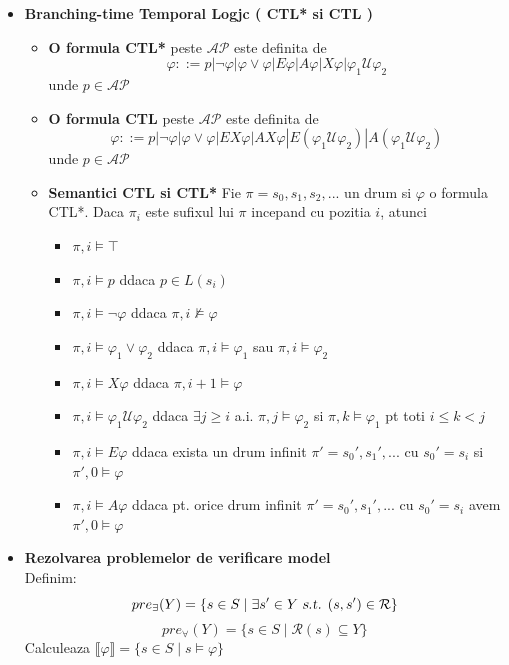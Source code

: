 \documentclass[10pt,a4paper,twocolumn]{report}
\begin{document}
\begin{itemize}
\begin{itemize}
\begin{itemize}
		\end{itemize}
	\end{itemize}
\item \textbf{Branching-time Temporal Logjc ( CTL*  si CTL )}
	\begin{itemize}
	\item \textbf{O formula CTL*} peste $\mathcal{AP}$ este definita de \[\varphi ::= p | \neg \varphi | \varphi \vee \varphi | E\varphi | A\varphi | X\varphi | \varphi_1 \mathcal{U} \varphi_2\] unde $p\in\mathcal{AP}$
	\item \textbf{O formula CTL} peste $\mathcal{AP}$ este definita de \[\varphi ::= p | \neg \varphi | \varphi \vee \varphi | EX\varphi | AX\varphi | E(\varphi_1 \mathcal{U} \varphi_2) | A(\varphi_1 \mathcal{U} \varphi_2)\] unde $p\in\mathcal{AP}$
	\item \textbf{Semantici CTL si CTL*} Fie $\pi=s_0,s_1,s_2,...$ un drum si $\varphi$ o formula CTL*. Daca $\pi_i$ este sufixul lui $\pi$ incepand cu pozitia $i$, atunci
		\begin{itemize}
		\item $\pi,i \models \top$
		\item $\pi,i \models p$ ddaca $p \in L(s_i)$
		\item $\pi,i \models \neg \varphi$ ddaca $\pi,i \not \models \varphi$
		\item  $\pi,i \models \varphi_1 \vee \varphi_2$ ddaca $\pi,i \models \varphi_1$ sau $\pi,i \models \varphi_2$
		\item $\pi,i \models X\varphi$ ddaca $\pi,i+1 \models \varphi$
		\item $\pi,i \models \varphi_1 \mathcal{U} \varphi_2$ ddaca $\exists j \geq i$ a.i. $\pi,j \models \varphi_2$ si $\pi,k \models \varphi_1$ pt toti $i \leq k < j$
		\item $\pi,i \models E\varphi$ ddaca exista un drum infinit $\pi'=s_0',s_1',...$ cu $s_0'=s_i$ si $\pi',0 \models \varphi$
		\item $\pi,i \models A\varphi$ ddaca pt. orice drum infinit $\pi'=s_0',s_1',...$ cu $s_0'=s_i$ avem $\pi',0 \models \varphi$
		\end{itemize}
	\end{itemize}
\item \textbf{Rezolvarea problemelor de verificare model}\\
Definim:
\[ pre_\exists(Y) = \{ s \in S \mid \exists s' \in Y \textsl{ s.t. } (s, s') \in \mathcal{R} \} \]
\[ pre_\forall(Y) = \{ s \in S \mid \mathcal{R}(s) \subseteq Y \} \]
Calculeaza $\llbracket \varphi \rrbracket = \{s \in S \mid s \models \varphi \}$

\end{itemize}
\end{document}
